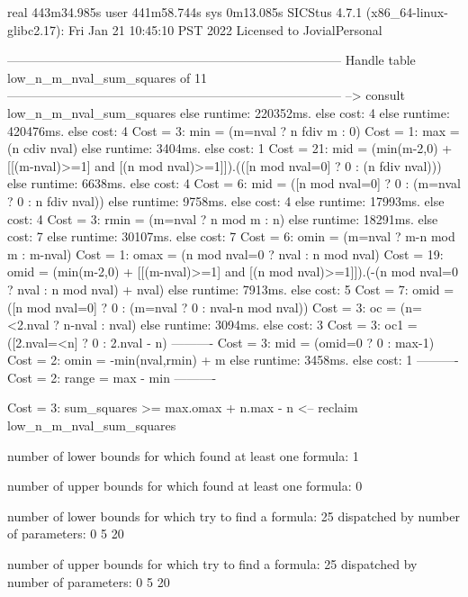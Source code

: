 real	443m34.985s
user	441m58.744s
sys	0m13.085s
SICStus 4.7.1 (x86_64-linux-glibc2.17): Fri Jan 21 10:45:10 PST 2022
Licensed to JovialPersonal


--------------------------------------------------------------------------------
Handle table low_n_m_nval_sum_squares of 11
--------------------------------------------------------------------------------
--> consult low_n_m_nval_sum_squares
else runtime: 220352ms. else cost: 4
else runtime: 420476ms. else cost: 4
Cost =  3:  min   = (m=nval ? n fdiv m : 0) %
Cost =  1:  max   = (n cdiv nval)
else runtime: 3404ms. else cost: 1
Cost = 21:  mid   = (min(m-2,0) + [[(m-nval)>=1] and [(n mod nval)>=1]]).(([n mod nval=0] ? 0 : (n fdiv nval))) %
else runtime: 6638ms. else cost: 4
Cost =  6:  mid   = ([n mod nval=0] ? 0 : (m=nval ? 0 : n fdiv nval)) %
else runtime: 9758ms. else cost: 4
else runtime: 17993ms. else cost: 4
Cost =  3:  rmin  = (m=nval ? n mod m : n) %
else runtime: 18291ms. else cost: 7
else runtime: 30107ms. else cost: 7
Cost =  6:  omin  = (m=nval ? m-n mod m : m-nval) %
Cost =  1:  omax  = (n mod nval=0 ? nval : n mod nval)
Cost = 19:  omid  = (min(m-2,0) + [[(m-nval)>=1] and [(n mod nval)>=1]]).(-(n mod nval=0 ? nval : n mod nval) + nval) %
else runtime: 7913ms. else cost: 5
Cost =  7:  omid  = ([n mod nval=0] ? 0 : (m=nval ? 0 : nval-n mod nval)) %
Cost =  3:  oc    = (n=<2.nval ? n-nval : nval)
else runtime: 3094ms. else cost: 3
Cost =  3:  oc1   = ([2.nval=<n] ? 0 : 2.nval - n) %
----------
Cost =  3:  mid   = (omid=0 ? 0 : max-1)
Cost =  2:  omin  = -min(nval,rmin) + m
else runtime: 3458ms. else cost: 1
----------
Cost =  2:  range = max - min
----------

Cost =  3:  sum_squares >= max.omax + n.max - n
<-- reclaim low_n_m_nval_sum_squares

number of lower bounds for which found at least one formula: 1

number of upper bounds for which found at least one formula: 0

number of lower bounds for which try to find a formula: 25
dispatched by number of parameters: 0  5  20

number of upper bounds for which try to find a formula: 25
dispatched by number of parameters: 0  5  20

